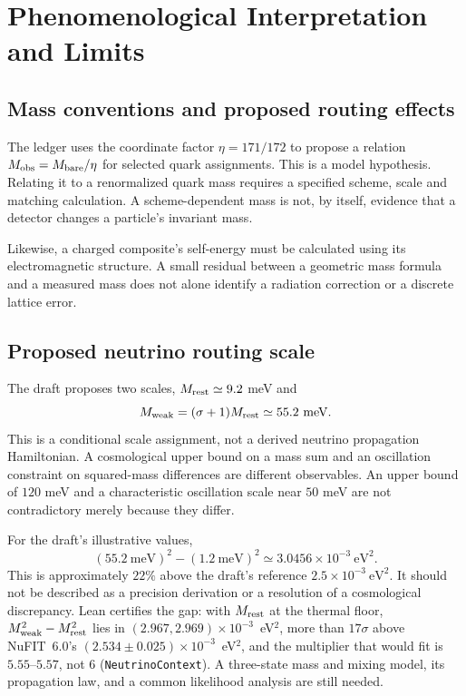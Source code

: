 \section{Phenomenological Interpretation and Limits}
\label{sec:observer_effect}

\subsection{Mass conventions and proposed routing effects}
The ledger uses the coordinate factor $\eta=171/172$ to propose a relation $M_{\rm obs}=M_{\rm bare}/\eta$ for selected quark assignments. This is a model hypothesis. Relating it to a renormalized quark mass requires a specified scheme, scale and matching calculation. A scheme-dependent mass is not, by itself, evidence that a detector changes a particle's invariant mass.

Likewise, a charged composite's self-energy must be calculated using its electromagnetic structure. A small residual between a geometric mass formula and a measured mass does not alone identify a radiation correction or a discrete lattice error.

\subsection{Proposed neutrino routing scale}
The draft proposes two scales, $M_{\rm rest}\simeq9.2$ meV and
\begin{equation}
M_{\rm weak}=(\sigma+1)M_{\rm rest}\simeq55.2\ \mathrm{meV}.
\end{equation}
This is a conditional scale assignment, not a derived neutrino propagation Hamiltonian. A cosmological upper bound on a mass sum and an oscillation constraint on squared-mass differences are different observables. An upper bound of $120$ meV and a characteristic oscillation scale near $50$ meV are not contradictory merely because they differ.

For the draft's illustrative values,
\begin{equation}
(55.2\ \mathrm{meV})^2-(1.2\ \mathrm{meV})^2
\simeq3.0456\times10^{-3}\ \mathrm{eV}^2.
\end{equation}
This is approximately $22\%$ above the draft's reference $2.5\times10^{-3}\ \mathrm{eV}^2$. It should not be described as a precision derivation or a resolution of a cosmological discrepancy. Lean certifies the gap: with $M_{\rm rest}$ at the thermal floor, $M_{\rm weak}^2-M_{\rm rest}^2$ lies in $(2.967,2.969)\times10^{-3}$~eV$^2$, more than $17\sigma$ above NuFIT~6.0's $(2.534\pm0.025)\times10^{-3}$~eV$^2$, and the multiplier that would fit is $5.55$--$5.57$, not $6$ (\texttt{NeutrinoContext}). A three-state mass and mixing model, its propagation law, and a common likelihood analysis are still needed.

